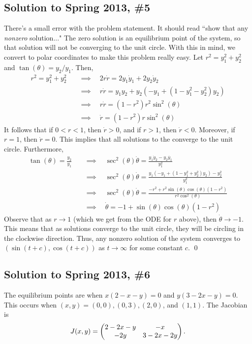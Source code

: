 \subsection*{Solution to Spring 2013, \#5}\label{s135}
There's a small error with the problem statement. It should read ``show that any \emph{nonzero} solution..." The zero solution is an equilibrium point of the system, so that solution will not be converging to the unit circle. With this in mind, we convert to polar coordinates to make this problem really easy. Let $r^2 = y_1^2 + y_2^2$ and $\tan (\theta) = y_2/y_1$. Then,
\begin{align*}
r^2 = y_1^2 + y_2^2 \quad &\implies \quad 2r\dot r = 2 y_1 \dot y_1 + 2 y_2 \dot y_2 \\
&\implies \quad r \dot r = y_1 y_2 + y_2 (-y_1 + (1 - y_1^2 - y_2^2)y_2) \\
&\implies \quad r \dot r = (1-r^2)r^2 \sin^2 (\theta) \\
&\implies \quad \dot r = (1-r^2) r \sin^2 (\theta)
\end{align*}
It follows that if $0<r<1$, then $\dot r > 0$, and if $r > 1$, then $\dot r < 0$. Moreover, if $r=1$, then $\dot r = 0$. This implies that all solutions to the converge to the unit circle. Furthermore,
\begin{align*}
\tan (\theta) = \frac{y_2}{y_1} \quad &\implies \quad \sec^2 (\theta) \dot \theta = \frac{y_1 \dot{y}_2 - y_2 \dot{y_1}}{y_1^2} \\
&\implies \quad \sec^2 (\theta) \dot \theta = \frac{y_1 (-y_1 +(1-y_1^2 + y_2^2)y_2) - y_2^2}{y_1^2} \\
&\implies \quad \sec^2 (\theta) \dot \theta = \frac{-r^2 + r^2 \sin(\theta) \cos(\theta) (1-r^2)}{r^2 \cos^2(\theta)} \\
&\implies \quad \dot \theta = -1 + \sin(\theta) \cos(\theta) (1-r^2)
\end{align*}
Observe that as $r \to 1$ (which we get from the ODE for $r$ above), then $\dot \theta \to -1$. This means that as solutions converge to the unit circle, they will be circling in the clockwise direction. Thus, any nonzero solution of the system converges to $(\sin(t+c),\cos(t+c))$ as $t \to \infty$ for some constant $c$.  \qed

\subsection*{Solution to Spring 2013, \#6}\label{s136}
The equilibrium points are when $x(2 - x -y ) = 0$ and $y(3 - 2x - y) = 0$. This occurs when
$(x, y) = (0, 0), (0, 3), (2, 0)$, and $(1, 1)$. The Jacobian is
$$J(x, y) = \begin{pmatrix} 2 - 2x - y & -x \\ -2y & 3 - 2x - 2y\end{pmatrix}.$$

